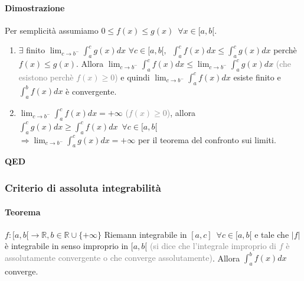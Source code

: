 \documentclass{article}
\newcommand{\R}{\mathbb{R}}
\begin{document}
\paragraph{{Dimostrazione}}
Per semplicità assumiamo $0 \leq f(x)\leq g(x) \,\,\, \forall x \in [a,b[$.
\begin{enumerate}
    \item $\exists$ finito $\lim_{c \rightarrow b^-} \int_{a}^{c} g(x) dx \,\, \forall c \in [a,b[,\,\,\, \int_{a}^{c}f(x)dx \leq \int_{a}^{c} g(x)dx$ perchè $f(x)\leq g(x)$. Allora $\lim_{c \rightarrow b^-} \int_{a}^{c} f(x)dx \leq \lim_{c \rightarrow b^-} \int_{a}^{c} g(x)dx$ \textcolor{grey}{(che esistono perchè $f(x)\geq 0$)} e quindi $\lim_{c \rightarrow b^-} \int_{a}^{c} f(x)dx $ esiste finito e $\int_{a}^{b} f(x)dx$ è convergente.
    \item $\lim_{c \rightarrow b^-} \int_{a}^{c} f(x) dx = +\infty $ \textcolor{grey}{($f(x)\geq 0$)}, allora $\int_{a}^{c} g(x)dx \geq \int_{a}^{c} f(x) dx \,\,\, \forall c \in [a,b[$ \\$\Rightarrow \lim_{c \rightarrow b^-} \int_{a}^{c} g(x)dx =+\infty$ per il teorema del confronto sui limiti.
\end{enumerate}
\begin{flushright}
\textbf{QED}
\end{flushright}

\subsubsection{{Criterio di assoluta integrabilità}}
\paragraph{{Teorema}}
$f:[a,b[\rightarrow \R, b \in \R \cup \{+\infty\}$ Riemann integrabile in $[a,c] \,\,\, \forall c \in [a,b[$ e tale che $|f|$ è integrabile in senso improprio in $[a,b[$ \textcolor{grey}{(si dice che l'integrale improprio di $f$ è assolutamente convergente o che converge assolutamente)}. Allora $\int_{a}^{b} f(x)dx$ converge.
\end{document}
